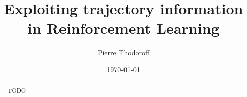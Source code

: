 \documentclass[12pt, oneside, extrafontsizes]{memoir}
\begin{document}

\pretitle{\begin{center}\cftchapterfont\huge}
\posttitle{\end{center}}
\preauthor{\begin{center}\huge}
\postauthor{\end{center}}
\predate{\begin{center}\large}
\postdate{\end{center}}

\title{Exploiting trajectory information in Reinforcement Learning}
\author{Pierre Thodoroff}
\date{\today}
\renewcommand\maketitlehookb{
\vfill
}
\renewcommand\maketitlehookc{
\vfill
\begin{center}
{
\large
Computer Science\\
McGill University, Montreal
}
\end{center}
\vspace{10mm}
}
\renewcommand\maketitlehookd{
\vspace{10mm}
A thesis submitted to McGill University in partial fulfilment of the requirements of
the degree of Master of Science.
\copyright Pierre Thodoroff; \today.
}

\begin{titlingpage}
\maketitle
\end{titlingpage}


\clearpage
{}
\renewcommand{\abstractname}{Acknowledgements}
\begin{abstract}
TODO
\end{abstract}
\end{document}
